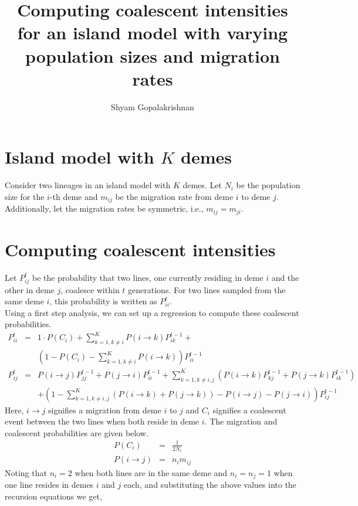 \documentclass[11pt]{article}
\title{Computing coalescent intensities for an island model with varying population sizes and migration rates}
\author{Shyam Gopalakrishnan}
\begin{document}
\maketitle
\section{Island model with $K$ demes}
Consider two lineages in an island model with $K$ demes. Let $N_i$ be the population
size for the $i$-th deme and $m_{ij}$ be the migration rate from deme $i$ to deme
$j$. Additionally, let the migration rates be symmetric, i.e., $m_{ij} = m_{ji}$. 

\section{Computing coalescent intensities}
Let $P_{ij}^{t}$ be the probability that two lines, one currently residing in deme $i$
and the other in deme $j$, coalesce within $t$ generations. For two lines sampled 
from the same deme $i$, this probability is written as $P_{ii}^{t}$.\\
Using a first step analysis, we can set up a regression to compute these coalescent 
probabilities. 
\begin{eqnarray}
P_{ii}^t &=& 1\cdot P(C_i) + \sum_{k=1, k \neq i}^{K}P(i \rightarrow k) P_{ik}^{t-1} + \nonumber \\
              &  & (1-P(C_i) -\sum_{k=1, k \neq i}^K P(i \rightarrow k)) P_{ii}^{t-1} \\
P_{ij}^t &=& P(i\rightarrow j) P_{jj}^{t-1} + P(j\rightarrow i) P_{ii}^{t-1} + \sum_{k=1,k\neq i,j}^K (P(i\rightarrow k)P_{kj}^{t-1}+P(j\rightarrow k)P_{ik}^{t-1}) \nonumber \\
              &  & + (1-\sum_{k=1,k\neq i,j}^K (P(i\rightarrow k) + P(j\rightarrow k)) - P(i\rightarrow j) - P(j\rightarrow i))P_{ij}^{t-1}
\end{eqnarray}
Here, $i\rightarrow j$ signifies a migration from deme $i$ to $j$ and $C_i$ signifies a coalescent event between the two lines when both reside in 
deme $i$. The migration and coalescent probabilities are given below.
\begin{eqnarray}
P(C_i) &=& \frac{1}{2N_i} \\
P(i\rightarrow j) &=& n_im_{ij}
\end{eqnarray}
Noting that $n_i=2$ when both lines are in the same deme and $n_i=n_j=1$ when one line resides in demes $i$ and $j$ each, and substituting the above values into the recursion equations we get,
\end{document}
